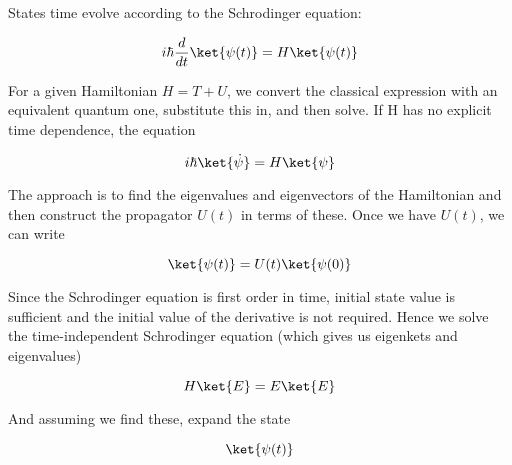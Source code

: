 States time evolve according to the Schrodinger equation:

\begin{equation}
	\label{eq:tdse}
	i\hbar\frac{d}{dt}\ket{\psi(t)} = H\ket{\psi(t)}
\end{equation}

For a given Hamiltonian $H = T + U$, we convert the classical expression with an equivalent quantum one, substitute this in, and then solve. If H has no explicit time dependence, the equation

\begin{equation}
	\label{eq:s1}
	i\hbar\ket{\dot{\psi}} = H\ket{\psi}
\end{equation}

The approach is to find the eigenvalues and eigenvectors of the Hamiltonian and then construct the propagator $U(t)$ in terms of these. Once we have $U(t)$, we can write

\begin{equation}
	\label{eq:s2}
	\ket{\psi(t)} = U(t)\ket{\psi(0)}
\end{equation}

Since the Schrodinger equation is first order in time, initial state value is sufficient and the initial value of the derivative is not required. Hence we solve the time-independent Schrodinger equation (which gives us eigenkets and eigenvalues)

\begin{equation}
	\label{eq:tise}
	H\ket{E} = E\ket{E}
\end{equation}

And assuming we find these, expand the state

\begin{equation}
	\label{eq:s3}
	\ket{\psi(t)}
\end{equation}
